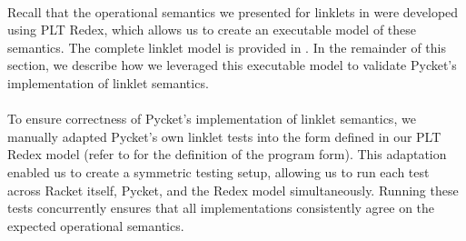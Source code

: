 		\paragraph{}%
			Recall that the operational semantics we presented for linklets in  were developed using PLT Redex, which allows us to create an executable model of these semantics. The complete linklet model is provided in . In the remainder of this section, we describe how we leveraged this executable model to validate Pycket’s implementation of linklet semantics.

		\paragraph{}%
			To ensure correctness of Pycket's implementation of linklet semantics, we manually adapted Pycket’s own linklet tests into the  form defined in our PLT Redex model (refer to  for the definition of the program form). This adaptation enabled us to create a symmetric testing setup, allowing us to run each test across Racket itself, Pycket, and the Redex model simultaneously. Running these tests concurrently ensures that all implementations consistently agree on the expected operational semantics.


